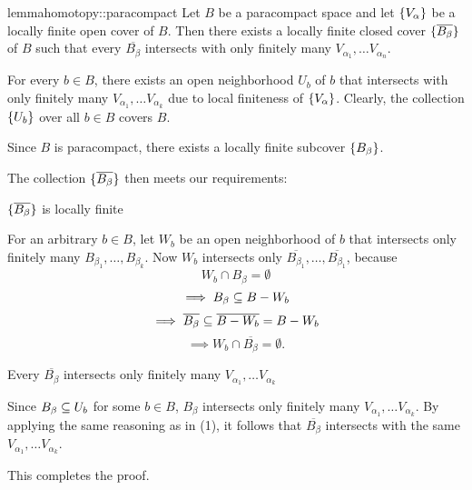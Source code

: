 \begin{mystatement}{lemma}{homotopy::paracompact} Let $B$ be a paracompact space and let $\{V_\alpha\}$ be a locally finite open cover of $B$. Then there exists a locally finite closed cover $\{\overline{B_\beta}\}$ of $B$ such that every $\overline{B_\beta}$ intersects with only finitely many $V_{\alpha_1}, \dots V_{\alpha_n}$. \end{mystatement}

\begin{myproof} For every $b \in B$, there exists an open neighborhood $U_b$ of $b$ that intersects with only finitely many $V_{\alpha_1}, \dots V_{\alpha_k}$ due to local finiteness of $\{V_\alpha\}$. Clearly, the collection $\{U_b\}$ over all $b \in B$ covers $B$.

Since $B$ is paracompact, there exists a locally finite subcover $\{B_\beta\}$.

The collection $\{\overline{B_\beta}\}$ then meets our requirements: \begin{sectionize} \item $\{\overline{B_\beta}\}$ is locally finite

For an arbitrary $b \in B$, let $W_b$ be an open neighborhood of $b$ that intersects only finitely many $B_{\beta_1}, \dots, B_{\beta_k}$. Now $W_b$ intersects only $\overline{B_{\beta_1}}, \dots, \overline{B_{\beta_1}}$, because \[ W_b \cap B_\beta = \emptyset \] \[ \implies B_\beta \subseteq{} B - W_b \] \[ \implies \overline{B_\beta} \subseteq{} \overline{B - W_b} = B - W_b \] \[ \implies W_b \cap \overline{B_\beta} = \emptyset. \]

\item Every $\overline{B_\beta}$ intersects only finitely many $V_{\alpha_1}, \dots V_{\alpha_k}$

Since $B_\beta \subseteq{} U_b$ for some $b \in B$, $B_\beta$ intersects only finitely many $V_{\alpha_1}, \dots V_{\alpha_k}$. By applying the same reasoning as in (1), it follows that $\overline{B_\beta}$ intersects with the same $V_{\alpha_1}, \dots V_{\alpha_k}$. \end{sectionize} This completes the proof. \end{myproof}